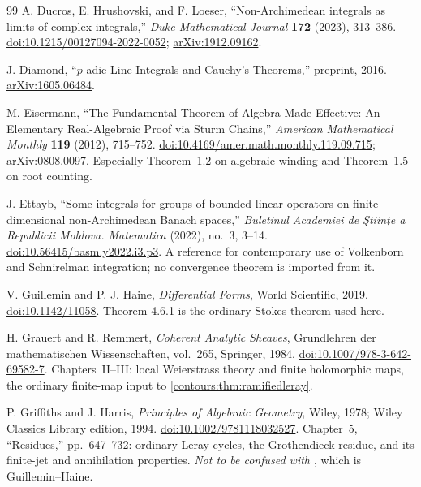 \documentclass[11pt,letterpaper]{article}
\theoremstyle{definition}
\theoremstyle{remark}
\numberwithin{equation}{section}
\begin{document}
\begin{thebibliography}{99}
A. Ducros, E. Hrushovski, and F. Loeser, ``Non-Archimedean integrals as limits of
complex integrals,'' \emph{Duke Mathematical Journal} \textbf{172} (2023), 313--386.
\href{https://doi.org/10.1215/00127094-2022-0052}{doi:10.1215/00127094-2022-0052};
\href{https://arxiv.org/abs/1912.09162}{arXiv:1912.09162}.

J. Diamond, ``$p$-adic Line Integrals and Cauchy's Theorems,'' preprint, 2016.
\href{https://arxiv.org/abs/1605.06484}{arXiv:1605.06484}.

M. Eisermann, ``The Fundamental Theorem of Algebra Made Effective: An Elementary
Real-Algebraic Proof via Sturm Chains,'' \emph{American Mathematical Monthly}
\textbf{119} (2012), 715--752.
\href{https://doi.org/10.4169/amer.math.monthly.119.09.715}{doi:10.4169/amer.math.monthly.119.09.715};
\href{https://arxiv.org/abs/0808.0097}{arXiv:0808.0097}. Especially Theorem~1.2 on
algebraic winding and Theorem~1.5 on root counting.

J. Ettayb, ``Some integrals for groups of bounded linear operators on
finite-dimensional non-Archimedean Banach spaces,'' \emph{Buletinul Academiei de
\c Stiin\c te a Republicii Moldova. Matematica} (2022), no.~3, 3--14.
\href{https://doi.org/10.56415/basm.y2022.i3.p3}{doi:10.56415/basm.y2022.i3.p3}. A
reference for contemporary use of Volkenborn and Schnirelman integration; no
convergence theorem is imported from it.

V. Guillemin and P. J. Haine, \emph{Differential Forms}, World Scientific, 2019.
\href{https://doi.org/10.1142/11058}{doi:10.1142/11058}. Theorem 4.6.1 is the ordinary
Stokes theorem used here.

H. Grauert and R. Remmert, \emph{Coherent Analytic Sheaves}, Grundlehren der
mathematischen Wissenschaften, vol.~265, Springer, 1984.
\href{https://doi.org/10.1007/978-3-642-69582-7}{doi:10.1007/978-3-642-69582-7}.
Chapters~II--III: local Weierstrass theory and finite holomorphic maps, the
ordinary finite-map input to \cref{contours:thm:ramifiedleray}.

P. Griffiths and J. Harris, \emph{Principles of Algebraic Geometry}, Wiley, 1978;
Wiley Classics Library edition, 1994.
\href{https://doi.org/10.1002/9781118032527}{doi:10.1002/9781118032527}.
Chapter~5, ``Residues,'' pp.~647--732: ordinary Leray cycles, the Grothendieck
residue, and its finite-jet and annihilation properties. \emph{Not to be confused
with \cite{GH}}, which is Guillemin--Haine.


\end{thebibliography}
\end{document}
